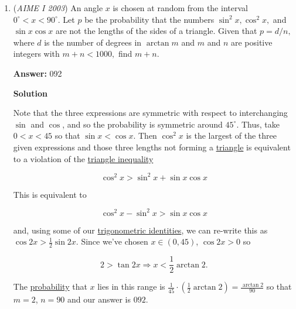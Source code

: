 \begin{enumerate}
 By law of sines on $\triangle{AMM'}$, 
 \[\frac{MA}{\sin(30-\theta)}=\frac{MM'}{\sin(\theta)}\implies MA = \frac{MM'\sin(30-\theta)}{\sin(\theta)}\]So:
 \[\frac{MM'\sin(30-\theta)}{\sin(\theta)}=\frac{CM\sin(23)}{\sin(7)}\implies\frac{\sin(30-\theta)}{\sin(\theta)}=\frac{\sin(23)}{\sin(7)}\because \triangle{CMM'} \text{is equilateral}\]This obviously gives $\theta = 7, 30-\theta = 23$

 Finally, 
 \[\angle{CMB}=\angle{CM'A}=\angle{CM'M}+\angle{MM'A}=60+23=\boxed{083}\]~Stereotypicalmathnerd

 


	\item (\textit{AIME I 2003}) An angle $x$ is chosen at random from the interval $0^\circ < x < 90^\circ.$ Let $p$ be the probability that the numbers $\sin^2 x, \cos^2 x,$ and $\sin x \cos x$ are not the lengths of the sides of a triangle. Given that $p = d/n,$ where $d$ is the number of degrees in $\arctan m$ and $m$ and $n$ are positive integers with $m + n < 1000,$ find $m + n.$

 \textbf{Answer: }092



\textbf{Solution}

Note that the three expressions are symmetric with respect to interchanging $\sin$ and $\cos$, and so the probability is symmetric around $45^\circ$.  Thus, take $0 < x < 45$ so that $\sin x < \cos x$.  Then $\cos^2 x$ is the largest of the three given expressions and those three lengths not forming a \href{https://artofproblemsolving.com/wiki/index.php?title=Triangle}{triangle} is equivalent to a violation of the \href{https://artofproblemsolving.com/wiki/index.php?title=Triangle\_inequality}{triangle inequality}

 
 \[\cos^2 x > \sin^2 x + \sin x \cos x\]

 This is equivalent to 

 
 \[\cos^2 x - \sin^2 x > \sin x \cos x\]

 and, using some of our \href{https://artofproblemsolving.com/wiki/index.php?title=Trigonometric\_identities}{trigonometric identities}, we can re-write this as $\cos 2x > \frac 12 \sin 2x$. Since we've chosen $x \in (0, 45)$, $\cos 2x > 0$ so 

 
 \[2 > \tan 2x \Longrightarrow  x < \frac 12 \arctan 2.\]

 The \href{https://artofproblemsolving.com/wiki/index.php?title=Probability}{probability} that $x$ lies in this range is $\frac 1{45} \cdot \left(\frac 12 \arctan 2\right) = \frac{\arctan 2}{90}$ so that $m = 2$, $n = 90$ and our answer is $\boxed{092}$.


\end{enumerate}
